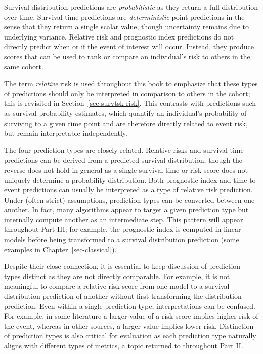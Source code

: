 \documentclass[
  letterpaper,
  krantz2]{style/krantz}
\begin{document}
Survival distribution predictions are \emph{probabilistic} as they
return a full distribution over time.
Survival time predictions are \emph{deterministic} point predictions in
the sense that they return a single scalar value, though uncertainty
remains due to underlying variance.
Relative risk and prognostic index predictions do not directly predict
when or if the event of interest will occur. Instead, they produce
scores that can be used to rank or compare an individual's risk to
others in the same cohort.

The term \emph{relative} risk is used throughout this book to emphasize
that these types of predictions should only be interpreted in comparison
to others in the cohort; this is revisited in
Section~\ref{sec-survtsk-risk}. This contrasts with predictions such as
survival probability estimates, which quantify an individual's
probability of surviving to a given time point and are therefore
directly related to event risk, but remain interpretable independently.

The four prediction types are closely related. Relative risks and
survival time predictions can be derived from a predicted survival
distribution, though the reverse does not hold in general as a single
survival time or risk score does not uniquely determine a probability
distribution. Both prognostic index and time-to-event predictions can
usually be interpreted as a type of relative risk prediction. Under
(often strict) assumptions, prediction types can be converted between
one another. In fact, many algorithms appear to target a given
prediction type but internally compute another as an intermediate step.
This pattern will appear throughout Part III; for example, the
prognostic index is computed in linear models before being transformed
to a survival distribution prediction (some examples in
Chapter~\ref{sec-classical}).

Despite their close connection, it is essential to keep discussion of
prediction types distinct as they are not directly comparable. For
example, it is not meaningful to compare a relative risk score from one
model to a survival distribution prediction of another without first
transforming the distribution prediction. Even within a single
prediction type, interpretations can be confused. For example, in some
literature a larger value of a risk score implies higher risk of the
event, whereas in other sources, a larger value implies lower risk.
Distinction of prediction types is also critical for evaluation as each
prediction type naturally aligns with different types of metrics, a
topic returned to throughout Part II.
\end{document}
